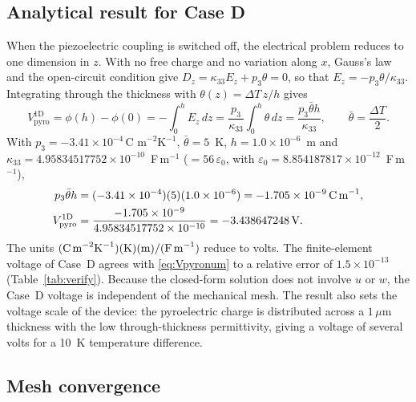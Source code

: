 \documentclass[a4paper,12pt]{elsarticle}
\begin{document}
\subsection{Analytical result for Case D}
\label{sec:caseD}

When the piezoelectric coupling is switched off, the electrical problem reduces to one
dimension in $z$. With no free charge and no variation along $x$, Gauss's law and the
open-circuit condition give
$D_z=\kappa_{33}E_z+p_3\theta=0$, so that
$E_z=-p_3\theta/\kappa_{33}$. Integrating through the thickness with
$\theta(z)=\Delta T\,z/h$ gives
\begin{equation}
V_{\mathrm{pyro}}^{\mathrm{1D}}=\phi(h)-\phi(0)
=-\int_0^h E_z\,dz
=\frac{p_3}{\kappa_{33}}\int_0^h\theta\,dz
=\frac{p_3\bar\theta h}{\kappa_{33}},
\qquad
\bar\theta=\frac{\Delta T}{2}.
\label{eq:Vpyro}
\end{equation}
With $p_3=-3.41\times10^{-4}\,\text{C m}^{-2}\text{K}^{-1}$,
$\bar\theta=5$~K, $h=1.0\times10^{-6}$~m and
$\kappa_{33}=4.95834517752\times10^{-10}$~F\,m$^{-1}$
($=56\,\varepsilon_0$, with $\varepsilon_0=8.854187817\times10^{-12}$~F\,m$^{-1}$),
\begin{align}
p_3\bar\theta h
&=(-3.41\times10^{-4})(5)(1.0\times10^{-6})
=-1.705\times10^{-9}\,\text{C\,m}^{-1},
\notag\\
V_{\mathrm{pyro}}^{\mathrm{1D}}
&=\frac{-1.705\times10^{-9}}{4.95834517752\times10^{-10}}
=-3.438647248\,\text{V}.
\label{eq:Vpyronum}
\end{align}
The units
$(\text{C\,m}^{-2}\text{K}^{-1})(\text{K})(\text{m})/
(\text{F\,m}^{-1})$ reduce to volts. The finite-element voltage of Case~D agrees
with \eqref{eq:Vpyronum} to a relative error of $1.5\times10^{-13}$
(Table~\ref{tab:verify}). Because the closed-form solution does not involve $u$ or
$w$, the Case~D voltage is independent of the mechanical mesh. The result also sets the voltage scale of the
device: the pyroelectric charge is distributed across a $1\,\mu$m thickness with the
low through-thickness permittivity, giving a voltage of several volts for a 10~K
temperature difference.

\subsection{Mesh convergence}
\label{sec:mesh-convergence}
\end{document}
